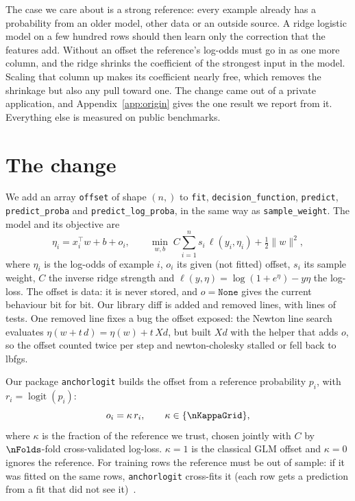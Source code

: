 \documentclass{article}
\newcommand{\code}[1]{\texttt{#1}}
\begin{document}
The case we care about is a strong reference: every example already has a probability from an older model, other data or an outside source.
A ridge logistic model on a few hundred rows should then learn only the correction that the features add.
Without an offset the reference's log-odds must go in as one more column, and the ridge shrinks the coefficient of the strongest input in the model.
Scaling that column up makes its coefficient nearly free, which removes the shrinkage but also any pull toward one.
The change came out of a private application, and Appendix~\ref{app:origin} gives the one result we report from it.
Everything else is measured on public benchmarks.

\section{The change}
\label{sec:change}

We add an array \code{offset} of shape $(n,)$ to \code{fit}, \code{decision\_function}, \code{predict}, \code{predict\_proba} and \code{predict\_log\_proba}, in the same way as \code{sample\_weight}.
The model and its objective are
\begin{equation}
\eta_i = x_i^\top w + b + o_i,
\qquad
\min_{w,b}\; C \sum_{i=1}^{n} s_i\, \ell(y_i, \eta_i) + \tfrac{1}{2}\lVert w\rVert^2 ,
\label{eq:offset}
\end{equation}
where $\eta_i$ is the log-odds of example $i$, $o_i$ its given (not fitted) offset, $s_i$ its sample weight, $C$ the inverse ridge strength and $\ell(y,\eta) = \log(1+e^{\eta}) - y\eta$ the log-loss.
The offset is data: it is never stored, and $o = \code{None}$ gives the current behaviour bit for bit.
Our library diff is \nPatchLibAdd{} added and \nPatchLibDel{} removed lines, with \nPatchTestAdd{} lines of tests.
One removed line fixes a bug the offset exposed: the Newton line search evaluates $\eta(w + t\,d) = \eta(w) + t\,X d$, but built $X d$ with the helper that adds $o$, so the offset counted twice per step and newton-cholesky stalled or fell back to lbfgs.

Our package \code{anchorlogit} builds the offset from a reference probability $p_i$, with $r_i = \operatorname{logit}(p_i)$:
\begin{equation}
o_i = \kappa\, r_i, \qquad \kappa \in \{\nKappaGrid\},
\label{eq:kappa}
\end{equation}
where $\kappa$ is the fraction of the reference we trust, chosen jointly with $C$ by $\nFolds$-fold cross-validated log-loss.
$\kappa = 1$ is the classical GLM offset and $\kappa = 0$ ignores the reference.
For training rows the reference must be out of sample: if it was fitted on the same rows, \code{anchorlogit} cross-fits it (each row gets a prediction from a fit that did not see it)~\citep{chernozhukov2018}.
\end{document}

